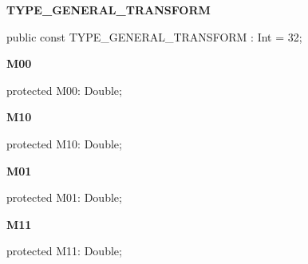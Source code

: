 \documentclass{report}
\newif\ifpdf
\begin{document}
\begin{list}{}
\begin{flushleft}
\ifpdf
\end{flushleft}
\fi


\par  \label{NewPascal.GUI.Geom.AffineTransform-TYPE_GENERAL_TRANSFORM}
\item[\textbf{TYPE{\_}GENERAL{\_}TRANSFORM}\hfill]
\ifpdf
\begin{flushleft}
\fi
\begin{ttfamily}
public const TYPE{\_}GENERAL{\_}TRANSFORM   : Int = 32;\end{ttfamily}

\ifpdf
\end{flushleft}
\fi


\par  \label{NewPascal.GUI.Geom.AffineTransform-M00}
\item[\textbf{M00}\hfill]
\ifpdf
\begin{flushleft}
\fi
\begin{ttfamily}
protected M00: Double;\end{ttfamily}

\ifpdf
\end{flushleft}
\fi


\par  \label{NewPascal.GUI.Geom.AffineTransform-M10}
\item[\textbf{M10}\hfill]
\ifpdf
\begin{flushleft}
\fi
\begin{ttfamily}
protected M10: Double;\end{ttfamily}

\ifpdf
\end{flushleft}
\fi


\par  \label{NewPascal.GUI.Geom.AffineTransform-M01}
\item[\textbf{M01}\hfill]
\ifpdf
\begin{flushleft}
\fi
\begin{ttfamily}
protected M01: Double;\end{ttfamily}

\ifpdf
\end{flushleft}
\fi


\par  \label{NewPascal.GUI.Geom.AffineTransform-M11}
\item[\textbf{M11}\hfill]
\ifpdf
\begin{flushleft}
\fi
\begin{ttfamily}
protected M11: Double;\end{ttfamily}


\end{flushleft}
\end{list}
\end{document}
